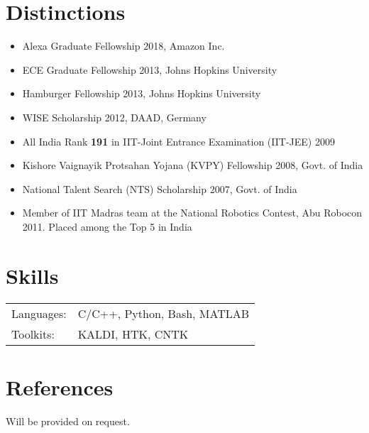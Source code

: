 \documentclass[margin,line,pifont,palatino,courier]{res}
\begin{document}
\begin{resume}
\section{\sc Distinctions}
\begin{itemize} \itemsep -2pt
    \item Alexa Graduate Fellowship 2018, Amazon Inc.
    \item ECE Graduate Fellowship 2013, Johns Hopkins University
    \item Hamburger Fellowship 2013, Johns Hopkins University
    \item WISE Scholarship 2012, DAAD, Germany
    \item All India Rank \textbf{191} in {IIT-Joint Entrance Examination (IIT-JEE)} 2009%
    \item Kishore Vaignayik Protsahan Yojana (KVPY) Fellowship 2008, Govt. of India %
    \item National Talent Search (NTS) Scholarship 2007, Govt. of India %
    \item Member of IIT Madras team at the National Robotics Contest, Abu Robocon 2011. Placed among the Top 5 in India
  \end{itemize}

\section{\sc Skills}

\begin{tabular}{@{}p{0.8in}p{6in}}

Languages:& C/C++, Python, Bash, MATLAB\\
Toolkits: & KALDI, HTK, CNTK \\

\end{tabular}

\section{\sc References}

Will be provided on request.

\end{resume}
\end{document}
